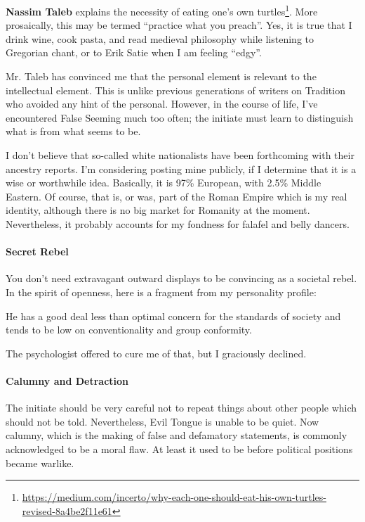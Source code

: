 \textbf{Nassim Taleb} explains the necessity of eating one's own turtles\footnote{\url{https://medium.com/incerto/why-each-one-should-eat-his-own-turtles-revised-8a4be2f11e61}}. More prosaically, this may be termed ``practice what you preach''. Yes, it is true that I drink wine, cook pasta, and read medieval philosophy while listening to Gregorian chant, or to Erik Satie when I am feeling ``edgy''.

Mr. Taleb has convinced me that the personal element is relevant to the intellectual element. This is unlike previous generations of writers on Tradition who avoided any hint of the personal. However, in the course of life, I've encountered False Seeming much too often; the initiate must learn to distinguish what is from what seems to be.

I don't believe that so-called white nationalists have been forthcoming with their ancestry reports. I'm considering posting mine publicly, if I determine that it is a wise or worthwhile idea. Basically, it is 97\% European, with 2.5\% Middle Eastern. Of course, that is, or was, part of the Roman Empire which is my real identity, although there is no big market for Romanity at the moment. Nevertheless, it probably accounts for my fondness for falafel and belly dancers.

\paragraph{Secret Rebel}


You don't need extravagant outward displays to be convincing as a societal rebel. In the spirit of openness, here is a fragment from my personality profile:

\begin{quotex}
He has a good deal less than optimal concern for the standards of society and tends to be low on conventionality and group conformity.
\end{quotex}


The psychologist offered to cure me of that, but I graciously declined.

\paragraph{Calumny and Detraction}


The initiate should be very careful not to repeat things about other people which should not be told. Nevertheless, Evil Tongue is unable to be quiet. Now calumny, which is the making of false and defamatory statements, is commonly acknowledged to be a moral flaw. At least it used to be before political positions became warlike.

